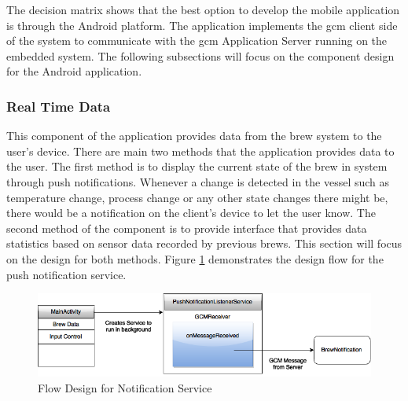 \documentclass{article}
\begin{document}
The decision matrix shows that the best option to develop the mobile application is through the Android platform. The application implements the \gls{gcm} client side of the system to communicate with the \gls{gcm} Application Server running on the embedded system. The following subsections will focus on the component design for the Android application.

\subsubsection{Real Time Data}
This component of the application provides data from the brew system to the user's device. There are main two methods that the application provides data to the user. The first method is to display the current state of the brew in system through push notifications. Whenever a change is detected in the vessel such as temperature change, process change or any other state changes there might be, there would be a notification on the client's device to let the user know. The second method of the component is to provide interface that provides data statistics based on sensor data recorded by previous brews. This section will focus on the design for both methods. Figure \ref{fig:gcm-push-notification} demonstrates the design flow for the push notification service.

\begin{figure}[H]
\begin{center}
\includegraphics[scale=0.50]{gcm-push-notification.png}
\caption{Flow Design for Notification Service}
\label{fig:gcm-push-notification}
\end{center}
\end{figure}
\end{document}
